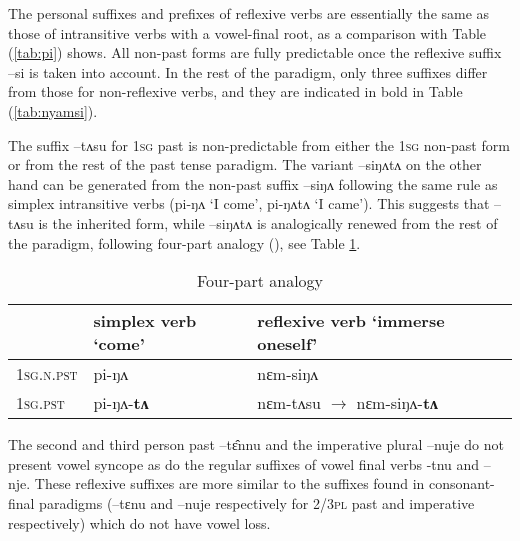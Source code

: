 \documentclass[twoside,a4paper,11pt]{article}
\newcommand{\ipa}[1]{{\phon#1}}
\begin{document}
 The personal suffixes and prefixes of reflexive verbs are essentially the same as those of  intransitive verbs with a vowel-final root, as a comparison with Table (\ref{tab:pi}) shows. All non-past forms are fully predictable once the reflexive suffix \ipa{--si} is taken into account. In the rest of the paradigm,  only three suffixes   differ  from those for non-reflexive verbs, and they are indicated in bold in Table (\ref{tab:nyamsi}).
 
   The   suffix \ipa{--tʌsu} for \textsc{1sg} past  is non-predictable from either the \textsc{1sg} non-past form or from the rest of the past tense paradigm. The variant \ipa{--siŋʌtʌ} on the other hand can be generated from the non-past suffix \ipa{--siŋʌ} following the same rule as simplex intransitive verbs (\ipa{pi-ŋʌ} `I come', \ipa{pi-ŋʌtʌ} `I came'). This   suggests that  \ipa{--tʌsu} is the inherited form, while  \ipa{--siŋʌtʌ} is analogically renewed from the rest of the paradigm, following four-part analogy (\citealt[167-175]{hock91principles}), see Table \ref{tab:four}.

 \begin{table}[h]
\caption{Four-part analogy}  \label{tab:four} \centering
\begin{tabular}{l|l|ll}
\toprule
  & simplex verb `come' & reflexive verb `immerse oneself' \\
 \midrule
\textsc{1sg.n.pst} &\ipa{pi-ŋʌ} & \ipa{nɛm-siŋʌ} \\
\textsc{1sg.pst}  &\ipa{pi-ŋʌ-\textbf{tʌ}} & \ipa{nɛm-tʌsu} $\rightarrow$ \ipa{nɛm-siŋʌ-\textbf{tʌ}} \\
\bottomrule			
\end{tabular}
\end{table} 

 
 The second and third person past \ipa{--tɛ̂nnu} and  the imperative plural \ipa{--nuje} do not present vowel syncope as do the regular  suffixes of vowel final verbs \ipa{-tnu} and \ipa{--nje}. These reflexive suffixes are more similar to the suffixes found in   consonant-final paradigms (\ipa{--tɛnu} and \ipa{--nuje} respectively for \textsc{2/3pl} past and imperative respectively) which do not have vowel loss.
 
\end{document}
